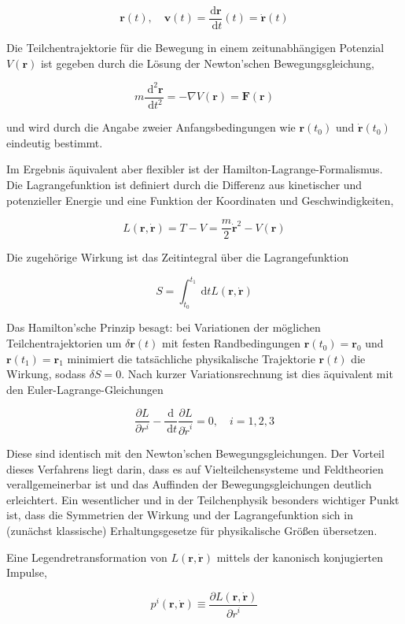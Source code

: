 \documentclass[10pt, letterpaper]{article}
\begin{document}
$$
\mathbf{r}(t), \quad \mathbf{v}(t)=\frac{\mathrm{d} \mathbf{r}}{\mathrm{~d} t}(t)=\dot{\mathbf{r}}(t)
$$

Die Teilchentrajektorie für die Bewegung in einem zeitunabhängigen Potenzial $V(\mathbf{r})$ ist gegeben durch die Lösung der Newton'schen Bewegungsgleichung,

$$
m \frac{\mathrm{~d}^{2} \mathbf{r}}{\mathrm{~d} t^{2}}=-\nabla V(\mathbf{r})=\mathbf{F}(\mathbf{r})
$$

und wird durch die Angabe zweier Anfangsbedingungen wie $\mathbf{r}\left(t_{0}\right)$ und $\dot{\mathbf{r}}\left(t_{0}\right)$ eindeutig bestimmt.

Im Ergebnis äquivalent aber flexibler ist der Hamilton-Lagrange-Formalismus. Die Lagrangefunktion ist definiert durch die Differenz aus kinetischer und potenzieller Energie und eine Funktion der Koordinaten und Geschwindigkeiten,

$$
L(\mathbf{r}, \dot{\mathbf{r}})=T-V=\frac{m}{2} \dot{\mathbf{r}}^{2}-V(\mathbf{r})
$$

Die zugehörige Wirkung ist das Zeitintegral über die Lagrangefunktion

$$
S=\int_{t_{0}}^{t_{1}} \mathrm{~d} t L(\mathbf{r}, \dot{\mathbf{r}})
$$

Das Hamilton'sche Prinzip besagt: bei Variationen der möglichen Teilchentrajektorien um $\delta \mathbf{r}(t)$ mit festen Randbedingungen $\mathbf{r}\left(t_{0}\right)=\mathbf{r}_{0}$ und $\mathbf{r}\left(t_{1}\right)=\mathbf{r}_{1}$ minimiert die tatsächliche physikalische Trajektorie $\mathbf{r}(t)$ die Wirkung, sodass $\delta S=0$. Nach kurzer Variationsrechnung ist dies äquivalent mit den Euler-Lagrange-Gleichungen

$$
\frac{\partial L}{\partial r^{i}}-\frac{\mathrm{d}}{\mathrm{~d} t} \frac{\partial L}{\partial \dot{r}^{i}}=0, \quad i=1,2,3
$$

Diese sind identisch mit den Newton'schen Bewegungsgleichungen. Der Vorteil dieses Verfahrens liegt darin, dass es auf Vielteilchensysteme und Feldtheorien verallgemeinerbar ist und das Auffinden der Bewegungsgleichungen deutlich erleichtert. Ein wesentlicher und in der Teilchenphysik besonders wichtiger Punkt ist, dass die Symmetrien der Wirkung und der Lagrangefunktion sich in (zunächst klassische) Erhaltungsgesetze für physikalische Größen übersetzen.

Eine Legendretransformation von $L(\mathbf{r}, \dot{\mathbf{r}})$ mittels der kanonisch konjugierten Impulse,

$$
p^{i}(\mathbf{r}, \dot{\mathbf{r}}) \equiv \frac{\partial L(\mathbf{r}, \dot{\mathbf{r}})}{\partial \dot{r}^{i}}
$$
\end{document}
